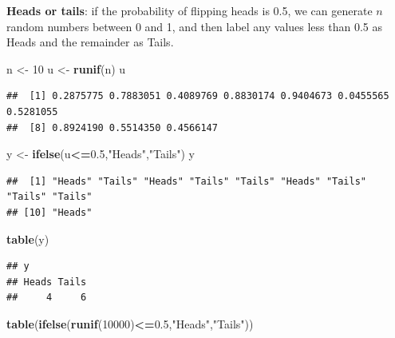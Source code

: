 \documentclass[
]{book}
\newenvironment{Shaded}{\begin{snugshade}}{\end{snugshade}}
\newcommand{\DecValTok}[1]{\textcolor[rgb]{0.00,0.00,0.81}{#1}}
\newcommand{\FloatTok}[1]{\textcolor[rgb]{0.00,0.00,0.81}{#1}}
\newcommand{\FunctionTok}[1]{\textcolor[rgb]{0.13,0.29,0.53}{\textbf{#1}}}
\newcommand{\NormalTok}[1]{#1}
\newcommand{\OtherTok}[1]{\textcolor[rgb]{0.56,0.35,0.01}{#1}}
\newcommand{\SpecialCharTok}[1]{\textcolor[rgb]{0.81,0.36,0.00}{\textbf{#1}}}
\newcommand{\StringTok}[1]{\textcolor[rgb]{0.31,0.60,0.02}{#1}}
\begin{document}
\textbf{Heads or tails}: if the probability of flipping heads is 0.5,
we can generate \(n\) random numbers between 0 and 1, and then label any values less
than 0.5 as Heads and the remainder as Tails.

\begin{Shaded}
\begin{Highlighting}[]
\NormalTok{n }\OtherTok{\textless{}{-}} \DecValTok{10}
\NormalTok{u }\OtherTok{\textless{}{-}} \FunctionTok{runif}\NormalTok{(n)}
\NormalTok{u}
\end{Highlighting}
\end{Shaded}

\begin{verbatim}
##  [1] 0.2875775 0.7883051 0.4089769 0.8830174 0.9404673 0.0455565 0.5281055
##  [8] 0.8924190 0.5514350 0.4566147
\end{verbatim}

\begin{Shaded}
\begin{Highlighting}[]
\NormalTok{y }\OtherTok{\textless{}{-}} \FunctionTok{ifelse}\NormalTok{(u}\SpecialCharTok{\textless{}=}\FloatTok{0.5}\NormalTok{,}\StringTok{"Heads"}\NormalTok{,}\StringTok{"Tails"}\NormalTok{)}
\NormalTok{y}
\end{Highlighting}
\end{Shaded}

\begin{verbatim}
##  [1] "Heads" "Tails" "Heads" "Tails" "Tails" "Heads" "Tails" "Tails" "Tails"
## [10] "Heads"
\end{verbatim}

\begin{Shaded}
\begin{Highlighting}[]
\FunctionTok{table}\NormalTok{(y)}
\end{Highlighting}
\end{Shaded}

\begin{verbatim}
## y
## Heads Tails 
##     4     6
\end{verbatim}

\begin{Shaded}
\begin{Highlighting}[]
\FunctionTok{table}\NormalTok{(}\FunctionTok{ifelse}\NormalTok{(}\FunctionTok{runif}\NormalTok{(}\DecValTok{10000}\NormalTok{)}\SpecialCharTok{\textless{}=}\FloatTok{0.5}\NormalTok{,}\StringTok{"Heads"}\NormalTok{,}\StringTok{"Tails"}\NormalTok{))}
\end{Highlighting}
\end{Shaded}
\end{document}
